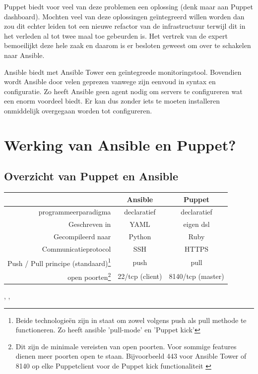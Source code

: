 Puppet biedt voor veel van deze problemen een oplossing (denk maar aan Puppet dashboard). Mochten veel van deze oplossingen ge\"integreerd willen worden dan zou dit echter leiden tot een  nieuwe refactor van de infrastructuur terwijl dit in het verleden al tot twee maal toe gebeurden is. Het vertrek van de expert bemoeilijkt deze hele zaak en daarom is er besloten geweest om over te schakelen naar Ansible. 

Ansible biedt met Ansible Tower een ge\"integreede monitoringstool. Bovendien wordt Ansible door velen geprezen vanwege zijn eenvoud in syntax en configuratie. Zo heeft Ansible geen agent nodig om servers te configureren wat een enorm voordeel biedt. Er kan dus zonder iets te moeten installeren onmiddelijk overgegaan worden tot configureren.


\section{Werking van Ansible en Puppet?}
\label{sec:methodologie-technische-verschillen}

\subsection{Overzicht van Puppet en Ansible}



\begin{minipage}{15cm}
\begin{tabular}{ r |c c }
& \textbf{Ansible} & \textbf{Puppet} \\
  \hline	  		
\gls{programmeerparadigma}  & declaratief & declaratief  \\
   \hline
 Geschreven in & YAML & eigen \gls{dsl}  \\
     \hline
      Gecompileerd naar & Python & Ruby \\
     \hline
   Communicatieprotocol & SSH & HTTPS \\
  
   \hline
  Push / Pull principe (standaard)\footnote{Beide technologie\"en zijn in staat om zowel volgens push als pull methode te functioneren. Zo heeft ansible 'pull-mode' \autocite{ansiblePull} en \textcite{puppetkick} 'Puppet kick' } & \gls{push} & \gls{pull} \\
   \hline
   open poorten\footnote{Dit zijn de minimale vereisten van open poorten. Voor sommige features dienen meer poorten open te staan. Bijvoorbeeld 443 voor Ansible Tower of 8140 op elke Puppetclient voor de Puppet kick functionaliteit \autocite{puppetkick} }  & 22/tcp (client) & 8140/tcp (master)\\
  \end{tabular}
  \end{minipage}   
 \textcite{languagePuppet}, \textcite{masterproef}, \textcite{ansibledoc}

